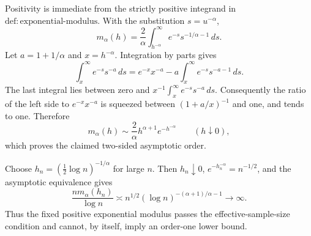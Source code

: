 Positivity is immediate from the strictly positive integrand in \(\mathrm{def:exponential\text{-}modulus}\). With the substitution \(s=u^{-\alpha}\),
\[
 m_\alpha(h)=\frac2\alpha\int_{h^{-\alpha}}^\infty e^{-s}s^{-1/\alpha-1}\,ds.
\]
Let \(a=1+1/\alpha\) and \(x=h^{-\alpha}\). Integration by parts gives
\[
 \int_x^\infty e^{-s}s^{-a}\,ds
 =e^{-x}x^{-a}-a\int_x^\infty e^{-s}s^{-a-1}\,ds.
\]
The last integral lies between zero and \(x^{-1}\int_x^\infty e^{-s}s^{-a}\,ds\). Consequently the ratio of the left side to \(e^{-x}x^{-a}\) is squeezed between \((1+a/x)^{-1}\) and one, and tends to one. Therefore
\[
 m_\alpha(h)\sim\frac2\alpha h^{\alpha+1}e^{-h^{-\alpha}}
 \qquad(h\downarrow0),
\]
which proves the claimed two-sided asymptotic order.

Choose \(h_n=(\tfrac12\log n)^{-1/\alpha}\) for large \(n\). Then \(h_n\downarrow0\), \(e^{-h_n^{-\alpha}}=n^{-1/2}\), and the asymptotic equivalence gives
\[
 \frac{n m_\alpha(h_n)}{\log n}
 \asymp n^{1/2}(\log n)^{-(\alpha+1)/\alpha-1}\longrightarrow\infty.
\]
Thus the fixed positive exponential modulus passes the effective-sample-size condition and cannot, by itself, imply an order-one lower bound.